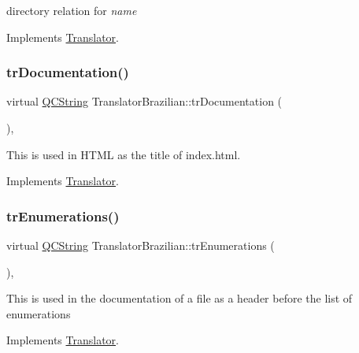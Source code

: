 directory relation for {\itshape name} 

Implements \mbox{\hyperlink{class_translator}{Translator}}.

\mbox{\label{class_translator_brazilian_afd2b14381e1e9a89f09578415acf9c52}} 
\subsubsection{\texorpdfstring{trDocumentation()}{trDocumentation()}}
{\footnotesize\ttfamily virtual \mbox{\hyperlink{class_q_c_string}{Q\+C\+String}} Translator\+Brazilian\+::tr\+Documentation (\begin{DoxyParamCaption}{ }\end{DoxyParamCaption})\hspace{0.3cm}{\ttfamily [inline]}, {\ttfamily [virtual]}}

This is used in H\+T\+ML as the title of index.\+html. 

Implements \mbox{\hyperlink{class_translator}{Translator}}.

\mbox{\label{class_translator_brazilian_a274ad454b0f7a4a1e7d046ce842e9300}} 
\subsubsection{\texorpdfstring{trEnumerations()}{trEnumerations()}}
{\footnotesize\ttfamily virtual \mbox{\hyperlink{class_q_c_string}{Q\+C\+String}} Translator\+Brazilian\+::tr\+Enumerations (\begin{DoxyParamCaption}{ }\end{DoxyParamCaption})\hspace{0.3cm}{\ttfamily [inline]}, {\ttfamily [virtual]}}

This is used in the documentation of a file as a header before the list of enumerations 

Implements \mbox{\hyperlink{class_translator}{Translator}}.

\mbox{\label{class_translator_brazilian_aad1ec82c7a20d6684db80ffcbc3c15a7}} 
